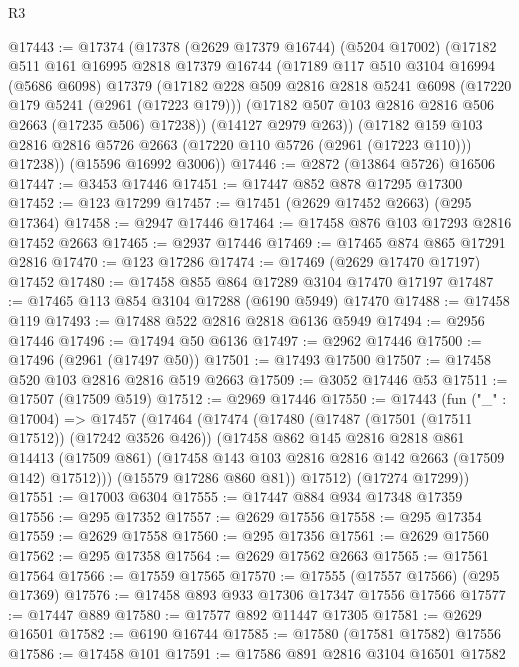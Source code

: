 \begin{lexlean}{R3}
\begin{coremodule}
@17443 := @17374
    (@17378
      (@2629 @17379 @16744)
      (@5204 @17002)
      (@17182
        @511
        @161
        @16995
        @2818
        @17379
        @16744
        (@17189
          @117
          @510
          @3104
          @16994
          (@5686 @6098)
          @17379
          (@17182
            @228
            @509
            @2816
            @2818
            @5241
            @6098
            (@17220 @179 @5241 (@2961 (@17223 @179)))
            (@17182 @507 @103 @2816 @2816 @506 @2663 (@17235 @506) @17238))
          (@14127 @2979 @263))
        (@17182 @159 @103 @2816 @2816 @5726 @2663 (@17220 @110 @5726 (@2961 (@17223 @110))) @17238))
      (@15596 @16992 @3006))
@17446 := @2872 (@13864 @5726) @16506
@17447 := @3453 @17446
@17451 := @17447 @852 @878 @17295 @17300
@17452 := @123 @17299
@17457 := @17451 (@2629 @17452 @2663) (@295 @17364)
@17458 := @2947 @17446
@17464 := @17458 @876 @103 @17293 @2816 @17452 @2663
@17465 := @2937 @17446
@17469 := @17465 @874 @865 @17291 @2816
@17470 := @123 @17286
@17474 := @17469 (@2629 @17470 @17197) @17452
@17480 := @17458 @855 @864 @17289 @3104 @17470 @17197
@17487 := @17465 @113 @854 @3104 @17288 (@6190 @5949) @17470
@17488 := @17458 @119
@17493 := @17488 @522 @2816 @2818 @6136 @5949
@17494 := @2956 @17446
@17496 := @17494 @50 @6136
@17497 := @2962 @17446
@17500 := @17496 (@2961 (@17497 @50))
@17501 := @17493 @17500
@17507 := @17458 @520 @103 @2816 @2816 @519 @2663
@17509 := @3052 @17446 @53
@17511 := @17507 (@17509 @519)
@17512 := @2969 @17446
@17550 := @17443
    (fun ("_" : @17004) =>
    @17457
      (@17464
        (@17474
          (@17480
            (@17487 (@17501 (@17511 @17512)) (@17242 @3526 @426))
            (@17458
              @862
              @145
              @2816
              @2818
              @861
              @14413
              (@17509 @861)
              (@17458 @143 @103 @2816 @2816 @142 @2663 (@17509 @142) @17512)))
          (@15579 @17286 @860 @81))
        @17512)
      (@17274 @17299))
@17551 := @17003 @6304
@17555 := @17447 @884 @934 @17348 @17359
@17556 := @295 @17352
@17557 := @2629 @17556
@17558 := @295 @17354
@17559 := @2629 @17558
@17560 := @295 @17356
@17561 := @2629 @17560
@17562 := @295 @17358
@17564 := @2629 @17562 @2663
@17565 := @17561 @17564
@17566 := @17559 @17565
@17570 := @17555 (@17557 @17566) (@295 @17369)
@17576 := @17458 @893 @933 @17306 @17347 @17556 @17566
@17577 := @17447 @889
@17580 := @17577 @892 @11447 @17305
@17581 := @2629 @16501
@17582 := @6190 @16744
@17585 := @17580 (@17581 @17582) @17556
@17586 := @17458 @101
@17591 := @17586 @891 @2816 @3104 @16501 @17582

\end{coremodule}
\end{lexlean}
